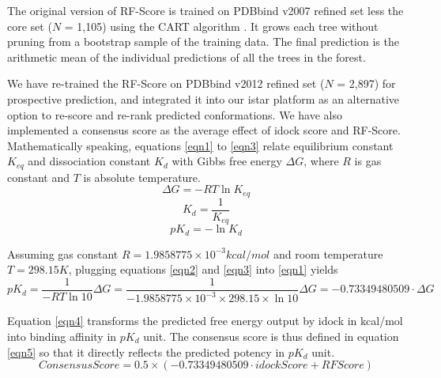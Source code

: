 \documentclass[10pt]{article}
\begin{document}
The original version of RF-Score \cite{564} is trained on PDBbind v2007 refined set less the core set ($N$ = 1,105) using the CART algorithm \cite{1310}. It grows each tree without pruning from a bootstrap sample of the training data. The final prediction is the arithmetic mean of the individual predictions of all the trees in the forest.

We have re-trained the RF-Score on PDBbind v2012 refined set ($N$ = 2,897) for prospective prediction, and integrated it into our istar platform as an alternative option to re-score and re-rank predicted conformations. We have also implemented a consensus score as the average effect of idock score and RF-Score. Mathematically speaking, equations \eqref{eqn1} to \eqref{eqn3} relate equilibrium constant $K_{eq}$ and dissociation constant $K_d$ with Gibbs free energy $\Delta G$, where $R$ is gas constant and $T$ is absolute temperature.
\begin{equation}
\label{eqn1}
\Delta G = -RT\ln K_{eq}
\end{equation}
\begin{equation}
\label{eqn2}
K_d = \frac{1}{K_{eq}}
\end{equation}
\begin{equation}
\label{eqn3}
pK_d = -\ln K_d
\end{equation}

Assuming gas constant $R = 1.9858775 \times 10^{-3} kcal/mol$ and room temperature $T = 298.15K$, plugging equations \eqref{eqn2} and \eqref{eqn3} into \eqref{eqn1} yields
\begin{equation}
\label{eqn4}
pK_d = \frac{1}{-RT\ln 10}\Delta G = \frac{1}{-1.9858775 \times 10^{-3} \times 298.15 \times \ln 10}\Delta G = -0.73349480509 \cdot \Delta G
\end{equation}

Equation \eqref{eqn4} transforms the predicted free energy output by idock in kcal/mol into binding affinity in $pK_d$ unit. The consensus score is thus defined in equation \eqref{eqn5} so that it directly reflects the predicted potency in $pK_d$ unit.
\begin{equation}
\label{eqn5}
ConsensusScore = 0.5 \times (-0.73349480509 \cdot idockScore + RFScore)
\end{equation}
\end{document}
